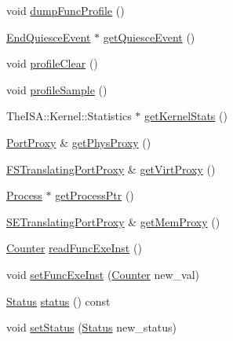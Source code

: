 \begin{DoxyCompactItemize}
\item 
void \hyperlink{structThreadState_a13fa12d1779a94a1e0b968946a1367c7}{dumpFuncProfile} ()
\item 
\hyperlink{classEndQuiesceEvent}{EndQuiesceEvent} $\ast$ \hyperlink{structThreadState_a0546f73d19db75274e9d0bc63c5f5908}{getQuiesceEvent} ()
\item 
void \hyperlink{structThreadState_acf9c88860776d7bd752317e8b550a5d5}{profileClear} ()
\item 
void \hyperlink{structThreadState_aba547b904bdcf83196f983f79d285caf}{profileSample} ()
\item 
TheISA::Kernel::Statistics $\ast$ \hyperlink{structThreadState_a3faa5e314c06241296ab582bb891a06a}{getKernelStats} ()
\item 
\hyperlink{classPortProxy}{PortProxy} \& \hyperlink{structThreadState_a2506d37aed5696e386e4d39270b53556}{getPhysProxy} ()
\item 
\hyperlink{classFSTranslatingPortProxy}{FSTranslatingPortProxy} \& \hyperlink{structThreadState_a03a07ebd804051b18b69156c2fff36a3}{getVirtProxy} ()
\item 
\hyperlink{classProcess}{Process} $\ast$ \hyperlink{structThreadState_a4b26cb784639047bab9de2b306955c4b}{getProcessPtr} ()
\item 
\hyperlink{classSETranslatingPortProxy}{SETranslatingPortProxy} \& \hyperlink{structThreadState_a5022ffa44e87701f51893d78c0def3a5}{getMemProxy} ()
\item 
\hyperlink{base_2types_8hh_ae1475755791765b8e6f6a8bb091e273e}{Counter} \hyperlink{structThreadState_a2b0bef6e1b1ac24e9322fbd09a511d11}{readFuncExeInst} ()
\item 
void \hyperlink{structThreadState_aa1adc19bd2d6fd2ca03c47d5fd6561a2}{setFuncExeInst} (\hyperlink{base_2types_8hh_ae1475755791765b8e6f6a8bb091e273e}{Counter} new\_\-val)
\item 
\hyperlink{classThreadContext_a67a0db04d321a74b7e7fcfd3f1a3f70b}{Status} \hyperlink{structThreadState_a2ad9e92a82d6f783b3061584729c2f4a}{status} () const 
\item 
void \hyperlink{structThreadState_acdf331c877974ed8697216475a21998d}{setStatus} (\hyperlink{classThreadContext_a67a0db04d321a74b7e7fcfd3f1a3f70b}{Status} new\_\-status)
\end{DoxyCompactItemize}
